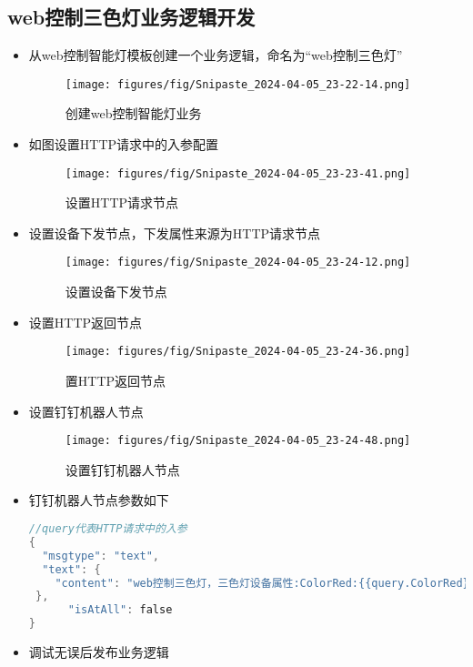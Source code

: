 \documentclass[12pt,hyperref,a4paper,UTF8]{ctexart}
\begin{document}
\subsection{web控制三色灯业务逻辑开发}
\begin{itemize}[itemsep=-5pt, topsep=0pt, partopsep=0pt]
    \item 从web控制智能灯模板创建一个业务逻辑，命名为“web控制三色灯”
    \begin{figure}[H]
      \centering
      \texttt{[image: figures/fig/Snipaste\_2024-04-05\_23-22-14.png]}
      \caption{创建web控制智能灯业务}
      \label{fig:enter-label}
    \end{figure}
    \item 如图设置HTTP请求中的入参配置
    \begin{figure}[H]
      \centering
      \texttt{[image: figures/fig/Snipaste\_2024-04-05\_23-23-41.png]}
      \caption{设置HTTP请求节点}
      \label{fig:enter-label}
    \end{figure}
    
    \item 设置设备下发节点，下发属性来源为HTTP请求节点
    \begin{figure}[H]
      \centering
      \texttt{[image: figures/fig/Snipaste\_2024-04-05\_23-24-12.png]}
      \caption{设置设备下发节点}
      \label{fig:enter-label}
    \end{figure}
    \item 设置HTTP返回节点
    \begin{figure}[H]
      \centering
      \texttt{[image: figures/fig/Snipaste\_2024-04-05\_23-24-36.png]}
      \caption{置HTTP返回节点}
      \label{fig:enter-label}
    \end{figure}
    \item 设置钉钉机器人节点
    \begin{figure}[H]
      \centering
      \texttt{[image: figures/fig/Snipaste\_2024-04-05\_23-24-48.png]}
      \caption{设置钉钉机器人节点}
      \label{fig:enter-label}
    \end{figure}
    \item 钉钉机器人节点参数如下
    \begin{lstlisting}[language=C]
//query代表HTTP请求中的入参
{
  "msgtype": "text", 
  "text": {
    "content": "web控制三色灯，三色灯设备属性:ColorRed:{{query.ColorRed}}   ColorBlue:{{query.ColorBlue}}   ColorGreen:{{query.ColorGreen}}   LightSwitch:{{query.Switch}}   Frequency:{{query.Frequency}}"
 }, 
      "isAtAll": false
}
    \end{lstlisting}
    \item 调试无误后发布业务逻辑
\end{itemize}
\end{document}
